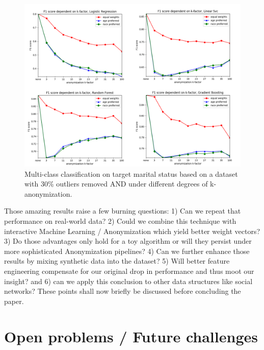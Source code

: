 \documentclass{llncs}
\begin{document}
\begin{figure}[!h]
	\centering
	\includegraphics[width=1\textwidth]{figures/anon_outliers/anon_outliers_marital_combined}
	\caption{Multi-class classification on target marital status based on a dataset with 30\% outliers removed AND under different degrees of k-anonymization.}
	\label{fig:results_anonymization_outliers_marital_status}
\end{figure}

Those amazing results raise a few burning questions: 1) Can we repeat that performance on real-world data? 2) Could we combine this technique with interactive Machine Learning / Anonymization which yield better weight vectors? 3) Do those advantages only hold for a toy algorithm or will they persist under more sophisticated Anonymization pipelines? 4) Can we further enhance those results by mixing synthetic data into the dataset? 5) Will better feature engineering compensate for our original drop in performance and thus moot our insight? and 6) can we apply this conclusion to other data structures like social networks? These points shall now briefly be discussed before concluding the paper.


\section{Open problems / Future challenges}
\label{sect:op_fc}
\end{document}
